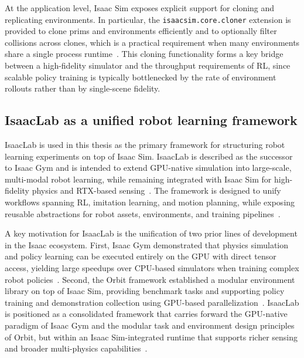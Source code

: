At the application level, Isaac Sim exposes explicit support for cloning and replicating environments. In particular, the \texttt{isaacsim.core.cloner} extension is provided to clone prims and environments efficiently and to optionally filter collisions across clones, which is a practical requirement when many environments share a single process runtime~\cite{nvidia_isaac_sim_510_extensions_api}. This cloning functionality forms a key bridge between a high-fidelity simulator and the throughput requirements of \ac{RL}, since scalable policy training is typically bottlenecked by the rate of environment rollouts rather than by single-scene fidelity.

\subsection{IsaacLab as a unified robot learning framework}
IsaacLab is used in this thesis as the primary framework for structuring robot learning experiments on top of Isaac Sim. IsaacLab is described as the successor to Isaac Gym and is intended to extend GPU-native simulation into large-scale, multi-modal robot learning, while remaining integrated with Isaac Sim for high-fidelity physics and RTX-based sensing~\cite{Mittal2025IsaacLab}. The framework is designed to unify workflows spanning \ac{RL}, imitation learning, and motion planning, while exposing reusable abstractions for robot assets, environments, and training pipelines~\cite{Mittal2025IsaacLab}.

A key motivation for IsaacLab is the unification of two prior lines of development in the Isaac ecosystem. First, Isaac Gym demonstrated that physics simulation and policy learning can be executed entirely on the \ac{GPU} with direct tensor access, yielding large speedups over CPU-based simulators when training complex robot policies~\cite{Makoviychuk2021IsaacGym}. Second, the Orbit framework established a modular environment library on top of Isaac Sim, providing benchmark tasks and supporting policy training and demonstration collection using GPU-based parallelization~\cite{Mittal2023Orbit}. IsaacLab is positioned as a consolidated framework that carries forward the GPU-native paradigm of Isaac Gym and the modular task and environment design principles of Orbit, but within an Isaac Sim-integrated runtime that supports richer sensing and broader multi-physics capabilities~\cite{Mittal2025IsaacLab}.

